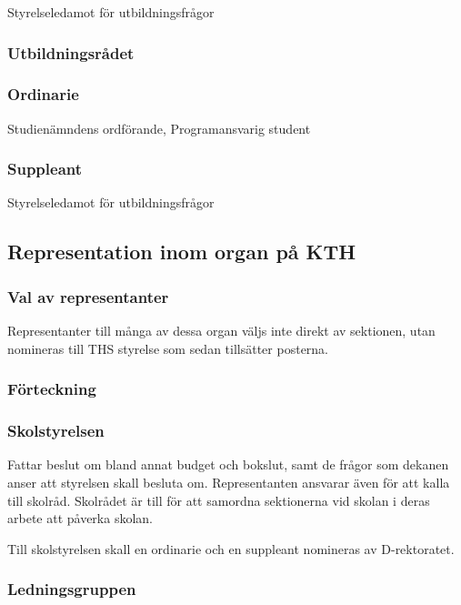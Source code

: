 \documentclass[a4paper,12pt]{article}
\begin{document}
Styrelseledamot för utbildningsfrågor

\subsubsection{Utbildningsrådet}

\subsubsection{Ordinarie}

Studienämndens ordförande, Programansvarig student

\subsubsection{Suppleant}

Styrelseledamot för utbildningsfrågor

\subsection{Representation inom organ på KTH}

\subsubsection{Val av representanter}

Representanter till många av dessa organ väljs inte direkt av sektionen, utan nomineras till THS styrelse som sedan tillsätter posterna.

\subsubsection{Förteckning}

\subsubsection{Skolstyrelsen}

Fattar beslut om bland annat budget och bokslut, samt de frågor som dekanen anser att styrelsen skall besluta om. Representanten ansvarar även för att kalla till skolråd. Skolrådet är till för att samordna sektionerna vid skolan i deras arbete att påverka skolan.

Till skolstyrelsen skall en ordinarie och en suppleant nomineras av D-rektoratet.

\subsubsection{Ledningsgruppen}
\end{document}
